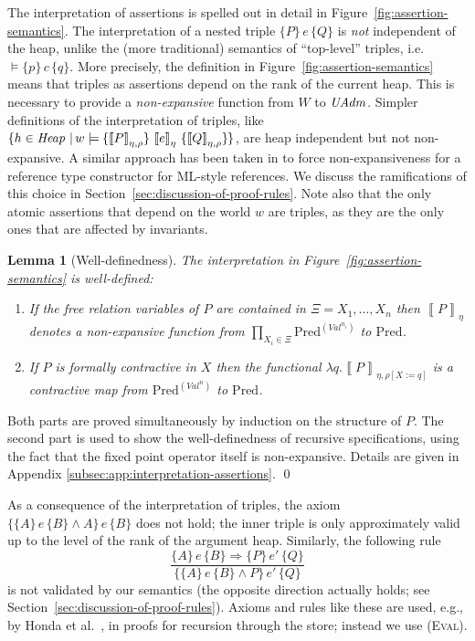\documentclass{LMCS}
\newtheorem{lemma}[theorem]{Lemma}
\theoremstyle{remark}
\newcommand{\Val}{\ensuremath{\mathit{Val}}\xspace}
\newcommand{\triple}[3]{{\ensuremath{\!\left.\{ #1 \}\, #2\, \{  #3 \}\!\right.}}}
\newcommand{\den}[1]{\left\llbracket #1
  \right\rrbracket}
\newcommand{\Pred}{\ensuremath{\mathrm{Pred}}\xspace}
\newcommand{\W}{\ensuremath{W}}
\newcommand{\X}{\ensuremath{\Xi}}
\begin{document}
The interpretation of assertions is spelled out in detail in Figure~\ref{fig:assertion-semantics}. 
The interpretation of  a nested triple $\triple{P}{e}{Q}$  is \emph{not} independent of the heap,    unlike the  (more traditional) semantics     of ``top-level'' triples, i.e.\  $\models \triple{p}{c}{q}$. More precisely, the definition in Figure~\ref{fig:assertion-semantics} means that triples as assertions depend on the  {rank} of the current heap. This is necessary to provide a 
 \emph{non-expansive} function from $\W$ to $\mathit{UAdm}$. 
Simpler definitions of the   interpretation of triples, like $\{ h\in \Heap\ |\, w \models \triple{\den{P}_{\eta,\rho
 }}{\den{e}_\eta}{\den{Q}_{\eta,\rho}}  \}$, are heap independent but   not non-expansive. 
A similar approach has been taken in \cite{Birkedal:Stovring:Thamsborg:09} to force non-expansiveness for a reference type constructor for ML-style references. 
We discuss the ramifications of this choice in Section~\ref{sec:discussion-of-proof-rules}. 
Note also that the only atomic assertions that depend on the world $w$ are triples, as they are the only ones that are affected by invariants.

\begin{lemma}[Well-definedness]
The interpretation in Figure~\ref{fig:assertion-semantics} is well-defined: 
\begin{enumerate}[\em(1)]
\item If the free relation variables of $P$ are contained in $\X= X_1,\ldots,X_n$ then $\den{P}_{\eta}$ denotes a non-expansive function from $\prod_{X_i\in\X}\Pred^{(\Val^{n_i})}$ to $\Pred$. 
\item If $P$ is formally contractive in $X$ then the functional $\lambda q.\den{P}_{\eta,\rho[X:=q]}$  is a contractive map from $\Pred^{(\Val^n)}$ to $\Pred$. 
\end{enumerate}
\end{lemma}

Both parts are proved simultaneously by induction on the structure of $P$. 
The second part is used to show the well-definedness of recursive specifications, using the fact that the fixed point operator itself is non-expansive. 
Details are given in Appendix \ref{subsec:app:interpretation-assertions}. \qed


As a  consequence of the interpretation of triples, the axiom  
$\triple{\triple{A}{e}{B} \wedge A}{e}{B}$ does not hold; the inner triple  is only approximately valid up to the level of the rank of the argument heap. Similarly, the following rule
\[
\frac{\triple{A}{e}{B} \Rightarrow \triple{P}{e'}{Q}} {\triple{\triple{A}{e}{B} \wedge P}{e'}{Q}}
\]
 is not validated by our semantics (the opposite direction actually holds; see Section~\ref{sec:discussion-of-proof-rules}). 
Axioms and rules like these are  used, 
 e.g., by Honda et al.\ \cite{Honda:Yoshida:Berger:05}, in   proofs for recursion through the store; instead we use ({\textsc{Eval}}).
\end{document}
